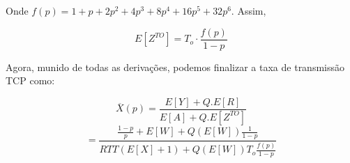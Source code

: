 Onde $f(p) = 1+p+2p^2 + 4p^3 + 8p^4 + 16p^5 + 32p^6$. Assim, 

$$E[Z^{TO}] =  T_o \cdot \frac{f(p)}{1-p}$$


Agora, munido de todas as derivações, podemos finalizar a taxa de transmissão TCP como:

$$ \overline{X}(p) = \frac{E[Y] + Q.E[R]}{E[A] + Q.E[Z^{TO}]}$$
$$ = \frac{\frac{1-p}{p}+E[W] + Q(E[W])\frac{1}{1-p} } { RTT(E[X] + 1) + Q(E[W])T_o\frac{f(p)}{1-p}} $$
